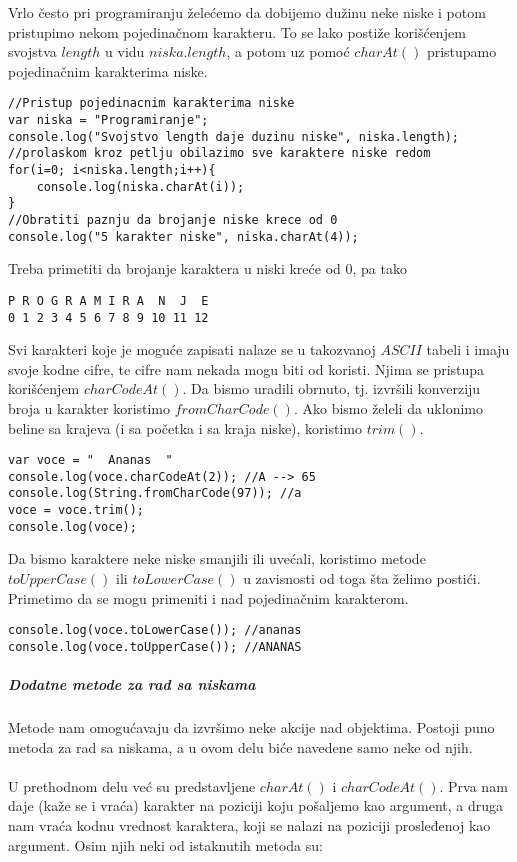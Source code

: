 Vrlo često pri programiranju želećemo da dobijemo dužinu neke niske i potom pristupimo nekom pojedinačnom karakteru. To se lako postiže korišćenjem svojstva $length$ u vidu $niska.length$, a potom uz pomoć $charAt()$ pristupamo pojedinačnim karakterima niske.
\begin{lstlisting}[backgroundcolor = \color{lightgray}, breaklines=true]
//Pristup pojedinacnim karakterima niske
var niska = "Programiranje";
console.log("Svojstvo length daje duzinu niske", niska.length);
//prolaskom kroz petlju obilazimo sve karaktere niske redom
for(i=0; i<niska.length;i++){
    console.log(niska.charAt(i));	
}
//Obratiti paznju da brojanje niske krece od 0
console.log("5 karakter niske", niska.charAt(4));
\end{lstlisting}
Treba primetiti da brojanje karaktera u niski kreće od 0, pa tako 
\begin{lstlisting}[backgroundcolor = \color{lightgray}, breaklines=true]
P R O G R A M I R A  N  J  E
0 1 2 3 4 5 6 7 8 9 10 11 12
\end{lstlisting}
Svi karakteri koje je moguće zapisati nalaze se u takozvanoj $ASCII$ tabeli i imaju svoje kodne cifre, te cifre nam nekada mogu biti od koristi. Njima se pristupa korišćenjem $charCodeAt()$. Da bismo uradili obrnuto, tj. izvršili konverziju broja u karakter koristimo $fromCharCode()$. Ako bismo želeli da uklonimo beline sa krajeva (i sa početka i sa kraja niske), koristimo $trim()$. 
\begin{lstlisting}[backgroundcolor = \color{lightgray}, breaklines=true]
var voce = "  Ananas  "
console.log(voce.charCodeAt(2)); //A --> 65
console.log(String.fromCharCode(97)); //a
voce = voce.trim();
console.log(voce);     
\end{lstlisting}
Da bismo karaktere neke niske smanjili ili uvećali, koristimo metode $toUpperCase()$ ili $toLowerCase()$ u zavisnosti od toga šta želimo postići. Primetimo da se mogu primeniti i nad pojedinačnim karakterom.
\begin{lstlisting}[backgroundcolor = \color{lightgray}, breaklines=true]
console.log(voce.toLowerCase()); //ananas
console.log(voce.toUpperCase()); //ANANAS
\end{lstlisting}
\subparagraph{Dodatne metode za rad sa niskama}
Metode nam omogućavaju da izvršimo neke akcije nad objektima. Postoji puno metoda za rad sa niskama, a u ovom delu biće navedene samo neke od njih. \\\\
U prethodnom delu već su predstavljene $charAt()$ i $charCodeAt()$. Prva nam daje (kaže se i vraća) karakter na poziciji koju pošaljemo kao argument, a druga nam vraća kodnu vrednost karaktera, koji se nalazi na poziciji prosleđenoj kao argument. Osim njih neki od istaknutih metoda su:
